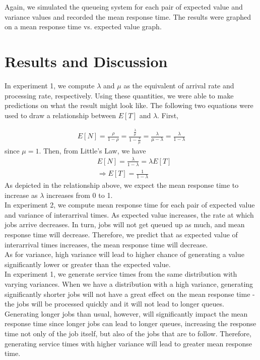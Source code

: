 \documentclass[12pt]{article}
\begin{document}
Again, we simulated the queueing system for each pair of expected value and variance values and recorded the mean response time. The results were graphed on a mean response time vs. expected value graph. 

\section{Results and Discussion} 
In experiment 1, we compute $\lambda$ and $\mu$ as the equivalent of arrival rate and processing rate, respectively. Using these quantities, we were able to make predictions on what the result might look like. The following two equations were used to draw a relationship between $E[T]$ and $\lambda$. First,

\begin{align*}
E[N] = \frac{\rho}{1 - \rho} = \frac{\frac{\lambda}{\mu}}{1 - \frac{\lambda}{\mu}} = \frac{\lambda}{\mu - \lambda} = \frac{\lambda}{1 - \lambda}
\end{align*}
since $\mu = 1$. Then, from Little's Law, we have 
\begin{align*}
&E[N] = \frac{\lambda}{1 - \lambda} = \lambda E[T] \\ 
&\Rightarrow 
E[T] = \frac{1}{1 - \lambda}
\end{align*}
As depicted in the relationship above, we expect the mean response time to increase as $\lambda$ increases from 0 to 1. \\

In experiment 2, we compute mean response time for each pair of expected value and variance of interarrival times. As expected value increases, the rate at which jobs arrive decreases. In turn, jobs will not get queued up as much, and mean response time will decrease. Therefore, we predict that as expected value of interarrival times increases, the mean response time will decrease. \\

As for variance, high variance will lead to higher chance of generating a value significantly lower or greater than the expected value. \\

In experiment 1, we generate service times from the same distribution with varying variances. When we have a distribution with a high variance, generating significantly shorter jobs will not have a great effect on the mean response time - the jobs will be processed quickly and it will not lead to longer queues. Generating longer jobs than usual, however, will significantly impact the mean response time since longer jobs can lead to longer queues, increasing the response time not only of the job itself, but also of the jobs that are to follow. Therefore, generating service times with higher variance will lead to greater mean response time. \\ 
\end{document}
